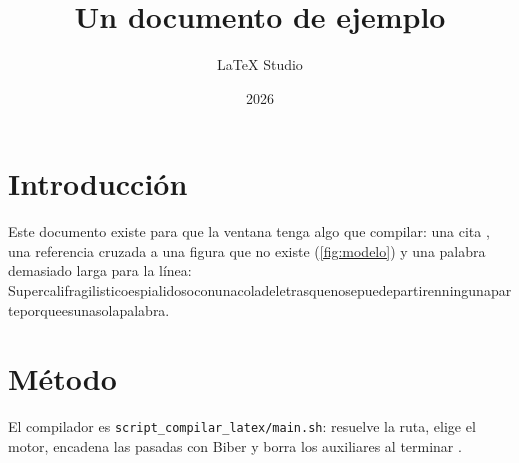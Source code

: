 \documentclass[11pt,a4paper]{article}
\title{Un documento de ejemplo}
\author{LaTeX Studio}
\date{2026}
\begin{document}
\maketitle

\section{Introducción}
Este documento existe para que la ventana tenga algo que compilar: una cita \parencite{knuth1984},
una referencia cruzada a una figura que no existe (\ref{fig:modelo}) y una palabra demasiado larga para la
línea: Supercalifragilisticoespialidosoconunacoladeletrasquenosepuedepartirenningunaparteporqueesunasolapalabra.

\section{Método}
El compilador es \texttt{script\_compilar\_latex/main.sh}: resuelve la ruta, elige el motor, encadena las pasadas con
Biber y borra los auxiliares al terminar \parencite{lamport1994}.

\printbibliography
\end{document}
